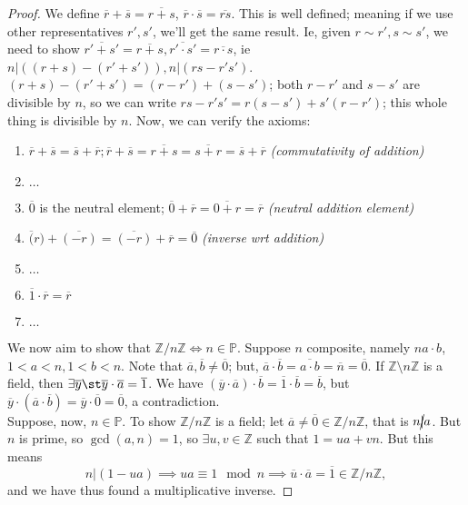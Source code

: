 \documentclass[12pt,oneside]{article}
\begin{document}
\begin{proof}
  We define $\overline{r} + \overline{s} = \overline{r + s}$, $\overline{r} \cdot \overline{s} = \overline{rs}$. This is well defined; meaning if we use other representatives $r', s'$, we'll get the same result. Ie, given $r \sim r', s \sim s'$, we need to show $\overline{r' + s'} = \overline{r+s}, \overline{r'\cdot s'} = \overline{r \cdot s}$, ie $n | ((r+s) - (r'+s')), n | (rs - r's')$.\\
  $(r+s) - (r'+s') = (r - r') + (s-s')$; both $r-r'$ and $s - s'$ are divisible by $n$, so we can write $rs - r's' = r(s-s') + s'(r-r')$; this whole thing is divisible by $n$. Now, we can verify the axioms:
  \begin{enumerate}
    \item $\overline{r} + \overline{s} = \overline{s} + \overline{r}; \overline{r} + \overline{s} = \overline{r+s} = \overline{s + r} = \overline{s} + \overline{r}$ \quad \textit{(commutativity of addition)}
    \item $\dots$
    \item $\overline{0}$ is the neutral element; $\overline{0} + \overline{r} = \overline{0 + r} = \overline{r}$ \quad \textit{(neutral addition element)}
    \item $\overline(r) + \overline{(-r)} = \overline{(-r)} + \overline{r} = \overline{0}$ \quad \textit{(inverse wrt addition)}
    \item $\dots$
    \item $\overline{1} \cdot \overline{r} = \overline{r}$
    \item $\dots$
  \end{enumerate}

  We now aim to show that $\mathbb{Z} /n \mathbb{Z} \iff n \in \mathbb{P}$. Suppose $n$ composite, namely $n a \cdot b$, $1 < a < n, 1 < b < n$. Note that $\overline{a}, \overline{b} \neq \overline{0}$; but, $\overline{a}\cdot \overline{b} = \overline{a \cdot b} = \overline{n} = \overline{0}$. If $\mathbb{Z}\setminus n \mathbb{Z}$ is a field, then $\exists \overline{y} \st \overline{y} \cdot \overline a = \overline{1}$. We have $(\overline{y} \cdot \overline{a}) \cdot \overline{b} = \overline{1} \cdot \overline{b} = \overline{b}$, but $\overline{y}\cdot (\overline{a} \cdot \overline{b}) = \overline{y} \cdot \overline{0} = \overline{0}$, a contradiction.\\
  Suppose, now, $n \in \mathbb{P}$. To show $\mathbb{Z}/n \mathbb{Z}$ is a field; let $\overline{a}  \neq \overline{0} \in \mathbb{Z}/n \mathbb{Z}$, that is $n \cancel{|}a$. But $n$ is prime, so $\gcd(a,n) = 1$, so $\exists u,v \in \mathbb{Z}$ such that $1 = ua + vn$. But this means $$n|(1-ua) \implies ua \equiv 1 \mod n \implies \overline{u} \cdot \overline{a} = \overline{1} \in \mathbb{Z}/n \mathbb{Z},$$ and we have thus found a multiplicative inverse.
\end{proof}
\end{document}
